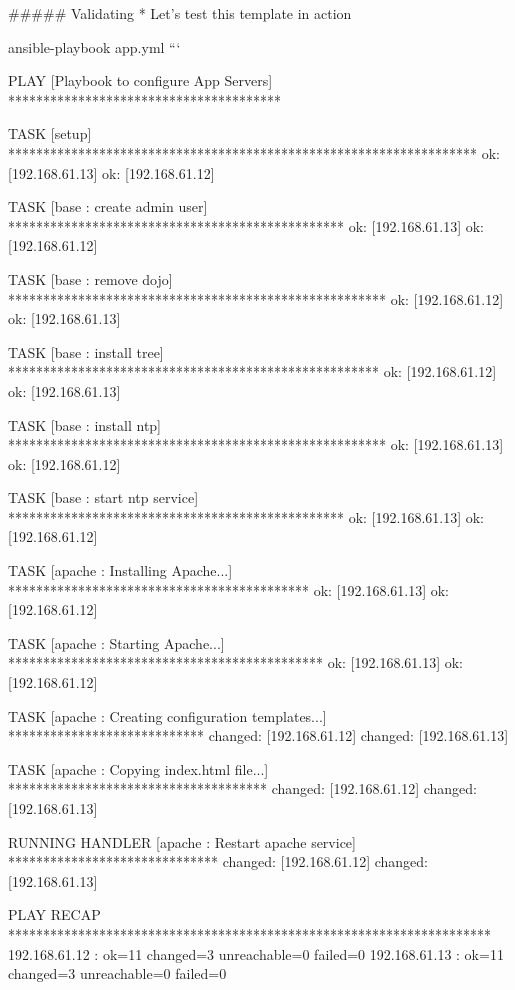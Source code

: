 \begin{code}

##### Validating
  * Let's test this template in action   
\end{code}
  ansible-playbook app.yml
```\newline
  [Output]\newline
\begin{code}
PLAY [Playbook to configure App Servers] ***************************************

TASK [setup] *******************************************************************
ok: [192.168.61.13]
ok: [192.168.61.12]

TASK [base : create admin user] ************************************************
ok: [192.168.61.13]
ok: [192.168.61.12]

TASK [base : remove dojo] ******************************************************
ok: [192.168.61.12]
ok: [192.168.61.13]

TASK [base : install tree] *****************************************************
ok: [192.168.61.12]
ok: [192.168.61.13]

TASK [base : install ntp] ******************************************************
ok: [192.168.61.13]
ok: [192.168.61.12]

TASK [base : start ntp service] ************************************************
ok: [192.168.61.13]
ok: [192.168.61.12]

TASK [apache : Installing Apache...] *******************************************
ok: [192.168.61.13]
ok: [192.168.61.12]

TASK [apache : Starting Apache...] *********************************************
ok: [192.168.61.13]
ok: [192.168.61.12]

TASK [apache : Creating configuration templates...] ****************************
changed: [192.168.61.12]
changed: [192.168.61.13]

TASK [apache : Copying index.html file...] *************************************
changed: [192.168.61.12]
changed: [192.168.61.13]

RUNNING HANDLER [apache : Restart apache service] ******************************
changed: [192.168.61.12]
changed: [192.168.61.13]

PLAY RECAP *********************************************************************
192.168.61.12              : ok=11   changed=3    unreachable=0    failed=0
192.168.61.13              : ok=11   changed=3    unreachable=0    failed=0
\end{code}

